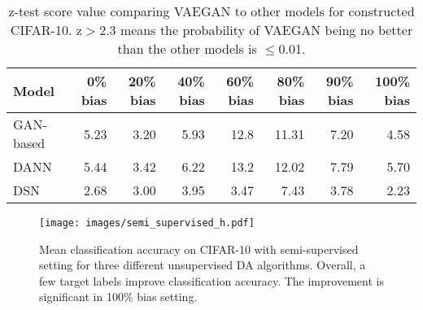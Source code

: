 \documentclass{article}
\newcommand\todo[1]{\textcolor{red}{#1}}
\begin{document}
\begin{table*}[t]
\centering
\caption{z-test score value comparing VAEGAN to other models for constructed CIFAR-10. z$>$2.3 means the probability of VAEGAN being no better than the other models is $\leq$0.01.}\label{cifar10_z_score}
\begin{tabular}{llllllll}
\hline
Model     & \multicolumn{1}{r}{0\% bias}  & \multicolumn{1}{r}{20\% bias }   & \multicolumn{1}{r}{40\% bias }   & \multicolumn{1}{r}{60\% bias}       & \multicolumn{1}{r}{80\% bias}       & \multicolumn{1}{r}{90\% bias}                    & \multicolumn{1}{r}{100\% bias}                  \\ \hline
GAN-based
& \multicolumn{1}{r}{\cellcolor[HTML]{E0DDDD}5.23 }
& \multicolumn{1}{r}{\cellcolor[HTML]{E0DDDD}3.20 }
& \multicolumn{1}{r}{\cellcolor[HTML]{E0DDDD}5.93 }
& \multicolumn{1}{r}{\cellcolor[HTML]{E0DDDD}12.8 } 
& \multicolumn{1}{r}{\cellcolor[HTML]{E0DDDD}11.31 }
& \multicolumn{1}{r}{\cellcolor[HTML]{E0DDDD}7.20} 
& \multicolumn{1}{r}{\cellcolor[HTML]{E0DDDD}4.58 } \\
DANN     
& \multicolumn{1}{r}{5.44 }      
& \multicolumn{1}{r}{3.42 }          
& \multicolumn{1}{r}{6.22 }      
& \multicolumn{1}{r}{13.2  }  
& \multicolumn{1}{r}{12.02  }   
& \multicolumn{1}{r}{7.79 }          
& \multicolumn{1}{r}{5.70  }                        \\
DSN     
& \multicolumn{1}{r}{\cellcolor[HTML]{E0DDDD}2.68 } 
& \multicolumn{1}{r}{\cellcolor[HTML]{E0DDDD}3.00 }
& \multicolumn{1}{r}{\cellcolor[HTML]{E0DDDD}3.95} 
& \multicolumn{1}{r}{\cellcolor[HTML]{E0DDDD}3.47 }  
& \multicolumn{1}{r}{\cellcolor[HTML]{E0DDDD}7.43}  
& \multicolumn{1}{r}{\cellcolor[HTML]{E0DDDD}3.78} 
& \multicolumn{1}{r}{\cellcolor[HTML]{E0DDDD}2.23 }\\ \hline
\end{tabular}
\vspace{-1ex}
\end{table*}


\begin{figure}[t]
\centering
\texttt{[image: images/semi\_supervised\_h.pdf]}
\caption{Mean classification accuracy on CIFAR-10 with semi-supervised setting for three different unsupervised DA algorithms. Overall, a few target labels improve classification accuracy. The improvement is significant in 100\% bias setting.}
\label{semi} 
\end{figure}
\end{document}
